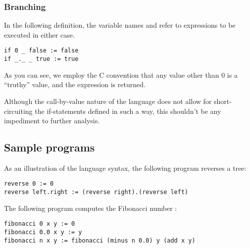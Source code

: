 \subsubsection{Branching}

In the following definition, the variable names  and 
refer to expressions to be executed in either case.

\begin{verbatim}
if 0 _ false := false
if _._ _ true := true
\end{verbatim}

As you can see, we employ the C convention that any value other than $0$ is a
``truthy'' value, and the expression  is returned.

Although the call-by-value nature of the language does not allow for
short-circuiting the if-statements defined in such a way, this shouldn't be any
impediment to further analysis.

\subsection{Sample programs}

As an illustration of the language syntax, the following program reverses a tree:

\begin{verbatim}
reverse 0 := 0
reverse left.right := (reverse right).(reverse left)
\end{verbatim}

The following program computes the Fibonacci number :

\begin{verbatim}
fibonacci 0 x y := 0
fibonacci 0.0 x y := y
fibonacci n x y := fibonacci (minus n 0.0) y (add x y)
\end{verbatim}
